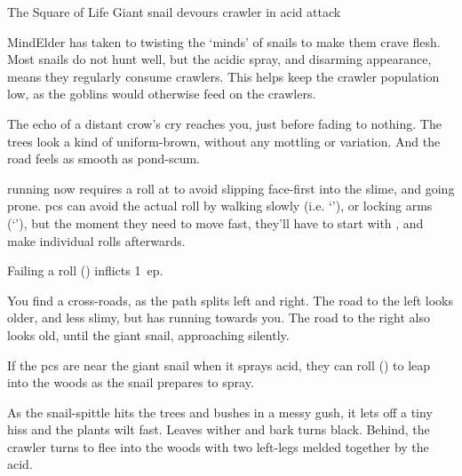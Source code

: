 \begin{multicols}{2}

\label{ravencopsIntro}

{The Square of Life}%
{Giant snail devours \gls{crawler} in acid attack}%

\begin{exampletext}
  \Gls{MindElder} has taken to twisting the `minds' of snails to make them crave flesh.
  Most snails do not hunt well, but the acidic spray, and disarming appearance, means they regularly consume \glspl{crawler}.
  This helps keep the \gls{crawler} population low, as the goblins would otherwise feed on the \glspl{crawler}.
\end{exampletext}

\begin{boxtext}
  The echo of a distant crow's cry reaches you, just before fading to nothing.
  The trees look a kind of uniform-brown, without any mottling or variation.
  And the road feels as smooth as pond-scum.
\end{boxtext}

\Gls{running} now requires a  roll at \tn[7] to avoid slipping face-first into the slime, and going prone.%
\Glspl{pc} can avoid the actual roll by walking slowly (i.e. `'), or locking arms (`'), but the moment they need to move fast, they'll have to start with , and make individual rolls afterwards.

Failing a  roll (\tn[7]) inflicts 1~\gls{ep}.

\begin{boxtext}
  You find a cross-roads, as the path splits left and right.
  The road to the left looks older, and less slimy, but has  running towards you.
  The road to the right also looks old, until the giant snail, approaching silently.
\end{boxtext}

If the \glspl{pc} are near the giant snail when it sprays acid, they can roll  (\tn[7]) to leap into the woods as the snail prepares to spray.

\begin{boxtext}
  As the snail-spittle hits the trees and bushes in a messy gush, it lets off a tiny hiss and the plants wilt fast.
  Leaves wither and bark turns black.
  Behind, the \gls{crawler} turns to flee into the woods with two left-legs melded together by the acid.
\end{boxtext}


\end{multicols}
